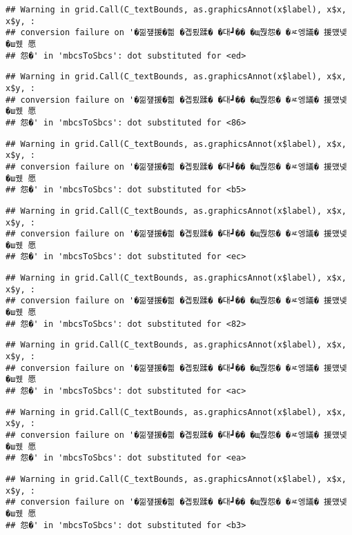 \documentclass[
]{article}
\begin{document}
\begin{verbatim}
## Warning in grid.Call(C_textBounds, as.graphicsAnnot(x$label), x$x, x$y, :
## conversion failure on '�낆쟾援�쁾 �곕룄蹂� �대┛�� �щ쭩怨� �ㅼ엥議� 援먰넻�ш퀬 愿
## 怨�' in 'mbcsToSbcs': dot substituted for <ed>
\end{verbatim}

\begin{verbatim}
## Warning in grid.Call(C_textBounds, as.graphicsAnnot(x$label), x$x, x$y, :
## conversion failure on '�낆쟾援�쁾 �곕룄蹂� �대┛�� �щ쭩怨� �ㅼ엥議� 援먰넻�ш퀬 愿
## 怨�' in 'mbcsToSbcs': dot substituted for <86>
\end{verbatim}

\begin{verbatim}
## Warning in grid.Call(C_textBounds, as.graphicsAnnot(x$label), x$x, x$y, :
## conversion failure on '�낆쟾援�쁾 �곕룄蹂� �대┛�� �щ쭩怨� �ㅼ엥議� 援먰넻�ш퀬 愿
## 怨�' in 'mbcsToSbcs': dot substituted for <b5>
\end{verbatim}

\begin{verbatim}
## Warning in grid.Call(C_textBounds, as.graphicsAnnot(x$label), x$x, x$y, :
## conversion failure on '�낆쟾援�쁾 �곕룄蹂� �대┛�� �щ쭩怨� �ㅼ엥議� 援먰넻�ш퀬 愿
## 怨�' in 'mbcsToSbcs': dot substituted for <ec>
\end{verbatim}

\begin{verbatim}
## Warning in grid.Call(C_textBounds, as.graphicsAnnot(x$label), x$x, x$y, :
## conversion failure on '�낆쟾援�쁾 �곕룄蹂� �대┛�� �щ쭩怨� �ㅼ엥議� 援먰넻�ш퀬 愿
## 怨�' in 'mbcsToSbcs': dot substituted for <82>
\end{verbatim}

\begin{verbatim}
## Warning in grid.Call(C_textBounds, as.graphicsAnnot(x$label), x$x, x$y, :
## conversion failure on '�낆쟾援�쁾 �곕룄蹂� �대┛�� �щ쭩怨� �ㅼ엥議� 援먰넻�ш퀬 愿
## 怨�' in 'mbcsToSbcs': dot substituted for <ac>
\end{verbatim}

\begin{verbatim}
## Warning in grid.Call(C_textBounds, as.graphicsAnnot(x$label), x$x, x$y, :
## conversion failure on '�낆쟾援�쁾 �곕룄蹂� �대┛�� �щ쭩怨� �ㅼ엥議� 援먰넻�ш퀬 愿
## 怨�' in 'mbcsToSbcs': dot substituted for <ea>
\end{verbatim}

\begin{verbatim}
## Warning in grid.Call(C_textBounds, as.graphicsAnnot(x$label), x$x, x$y, :
## conversion failure on '�낆쟾援�쁾 �곕룄蹂� �대┛�� �щ쭩怨� �ㅼ엥議� 援먰넻�ш퀬 愿
## 怨�' in 'mbcsToSbcs': dot substituted for <b3>
\end{verbatim}
\end{document}
